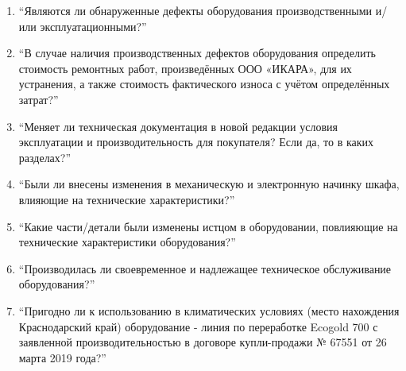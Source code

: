 \begin{enumerate}
	\item \enquote{Являются ли обнаруженные дефекты оборудования производственными и/или эксплуатационными?}
	
	\item \enquote{В случае наличия производственных дефектов оборудования определить стоимость ремонтных работ, произведённых ООО «ИКАРА», для их устранения, а также стоимость фактического износа с учётом определённых затрат?}
	
	\item \enquote{Меняет ли техническая документация в новой редакции условия эксплуатации и производительность для покупателя? Если да, то в каких разделах?}
	
	\item \enquote{Были ли внесены изменения в механическую и электронную начинку шкафа, влияющие на технические характеристики?}
	
	\item \enquote{Какие части/детали были изменены истцом в оборудовании, повлияющие на технические характеристики оборудования?}
	
	\item \enquote{Производилась ли своевременное и надлежащее техническое обслуживание оборудования?}
	
	\item \enquote{Пригодно ли к использованию в климатических условиях (место нахождения 	Краснодарский край) оборудование - линия по переработке Ecogold 700 с заявленной производительностью в договоре купли-продажи № 67551 от 26 		марта 2019 года?}
	

\end{enumerate}
